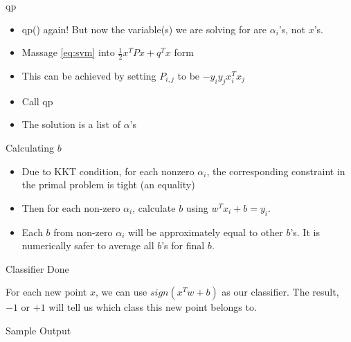 \documentclass[12pt,fleqn]{article}
\begin{document}
qp

\begin{itemize}
   \item qp() again! But now the variable(s) we are solving for are
     $\alpha_i$'s, not $x$'s. 
   \item Massage \ref{eq:svm} into  $\frac{1}{2}x^{T}Px+q^{T}x$ form
   \item This can be achieved by setting $P_{i,j}$ to be $-y_{i}y_{j}x_{i}^{T}x_{j}$
   \item Call qp
   \item The solution is a list of $\alpha$'s 
\end{itemize}

Calculating $b$

\begin{itemize}
   \item Due to KKT condition, for each nonzero $\alpha_{i}$, the corresponding
   constraint in the primal problem is tight (an equality)
   \item Then for each non-zero $\alpha_{i}$, calculate $b$ using $w^{T}x_{i}+b = y_{i}$.
   \item Each $b$ from non-zero $\alpha_{i}$ will be approximately equal to
   other $b$'s. It is numerically safer to average all $b$'s for final $b$.
\end{itemize}

Classifier Done

For each new point $x$, we can use $sign(x^{T}w+b)$ as our classifier. The
result, $-1$ or $+1$ will tell us which class this new point belongs to.

Sample Output

\begin{figure}[!hbp]
\caption{}
\end{figure}
\end{document}
